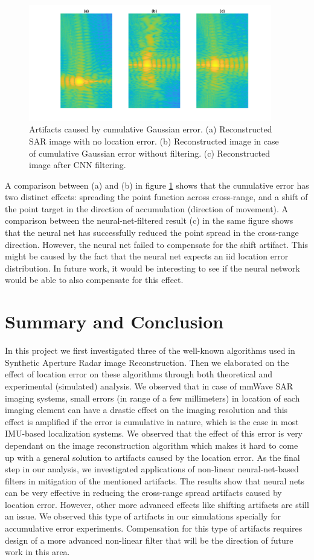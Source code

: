 \documentclass{article}
\begin{document}
\begin{figure}[h!]
    \centering
    \includegraphics[width=0.945\textwidth]{Figures/zoomed_nl.png}
\caption{Artifacts caused by cumulative Gaussian error. (a) Reconstructed SAR image with no location error. (b) Reconstructed image in case of cumulative Gaussian error without filtering. (c) Reconstructed image after CNN filtering.}
\label{cumsum_error}
\end{figure}
A comparison between (a) and (b) in figure \ref{cumsum_error} shows that the cumulative error has two distinct effects: spreading the point function across cross-range, and a shift of the point target in the direction of accumulation (direction of movement). A comparison between the neural-net-filtered result (c) in the same figure shows that the neural net has successfully reduced the point spread in the cross-range direction. However, the neural net failed to compensate for the shift artifact. This might be caused by the fact that the neural net expects an iid location error distribution. In future work, it would be interesting to see if the neural network would be able to also compensate for this effect.  

\section{Summary and Conclusion}
In this project we first investigated three of the well-known algorithms used in Synthetic Aperture Radar image Reconstruction. Then we elaborated on the effect of location error on these algorithms through both theoretical and experimental (simulated) analysis. We observed that in case of mmWave SAR imaging systems, small errors (in range of a few millimeters) in location of each imaging element can have a drastic effect on the imaging resolution and this effect is amplified if the error is cumulative in nature, which is the case in most IMU-based localization systems. We observed that the effect of this error is very dependant on the image reconstruction algorithm which makes it hard to come up with a general solution to artifacts caused by the location error. As the final step in our analysis, we investigated applications of non-linear neural-net-based filters in mitigation of the mentioned artifacts. The results show that neural nets can be very effective in reducing the cross-range spread artifacts caused by location error. However, other more advanced effects like shifting artifacts are still an issue. We observed this type of artifacts in our simulations specially for accumulative error experiments. Compensation for this type of artifacts requires design of a more advanced non-linear filter that will be the direction of future work in this area. 
\end{document}
